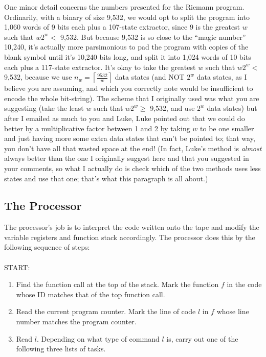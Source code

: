 \documentclass[11pt]{article}
\begin{document}
One minor detail concerns the numbers presented for the Riemann program. Ordinarily, with a binary of size 9,532, we would opt to split the program into 1,060 words of 9 bits each plus a 107-state extractor, since 9 is the greatest $w$ such that $w2^w <$ 9,532. But because 9,532 is so close to the ``magic number'' 10,240, it's actually more parsimonious to pad the program with copies of the blank symbol until it's 10,240 bits long, and split it into 1,024 words of 10 bits each plus a 117-state extractor.
{\color{red} It's okay to take the greatest $w$ such that $w2^w <$ 9,532, because we use $n_w = \left \lceil{\frac{9532}{w}}\right \rceil$ data states (and NOT $2^w$ data states, as I believe you are assuming, and which you correctly note would be insufficient to encode the whole bit-string). The scheme that I originally used was what you are suggesting (take the least $w$ such that $w2^w \ge$ 9,532, and use $2^w$ data states) but after I emailed as much to you and Luke, Luke pointed out that we could do better by a multiplicative factor between 1 and 2 by taking $w$ to be one smaller and just having more some extra data states that can't be pointed to; that way, you don't have all that wasted space at the end! (In fact, Luke's method is \emph{almost} always better than the one I originally suggest here and that you suggested in your comments, so what I actually do is check which of the two methods uses less states and use that one; that's what this paragraph is all about.)}


\subsection{The Processor}

The processor's job is to interpret the code written onto the tape and modify the variable registers and function stack accordingly. The processor does this by the following sequence of steps:  \\ \\
START:
\begin{enumerate}
\item Find the function call at the top of the stack. Mark the function $f$ in the code whose ID matches that of the top function call.
\item Read the current program counter. Mark the line of code $l$ in $f$ whose line number matches the program counter.
\item Read $l$. Depending on what type of command $l$ is, carry out one of the following three lists of tasks.
\end{enumerate}
\end{document}
